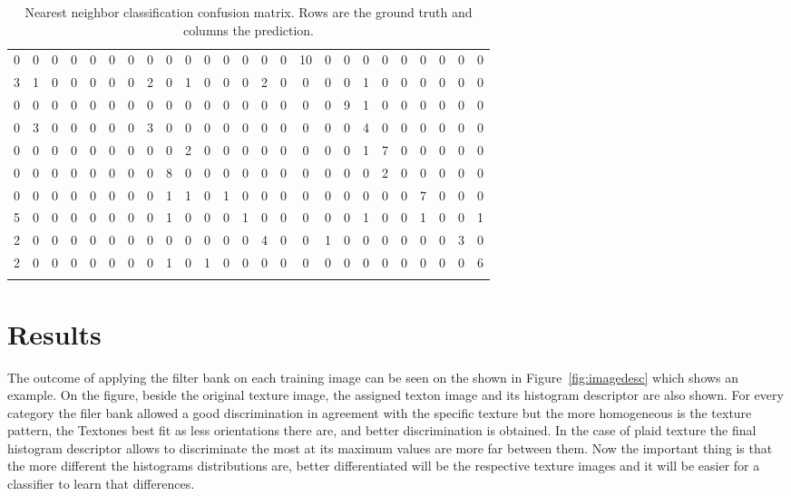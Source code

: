 \documentclass[10pt,twocolumn,letterpaper]{article}
\begin{document}
\begin{table}
\begin{subtable}{.5\textwidth}
\begin{tabular}{|c|c|c|c|c|c|c|c|c|c|c|c|c|c|c|c|c|c|c|c|c|c|c|c|c|}
0 & 0 & 0 & 0 & 0 & 0 & 0 & 0 & 0 & 0 & 0 & 0 & 0 & 0 & 0 & 10 & 0 & 0 & 0 & 0 & 0 & 0 & 0 & 0 & 0\\
3 & 1 & 0 & 0 & 0 & 0 & 0 & 2 & 0 & 1 & 0 & 0 & 0 & 2 & 0 & 0 & 0 & 0 & 1 & 0 & 0 & 0 & 0 & 0 & 0\\
0 & 0 & 0 & 0 & 0 & 0 & 0 & 0 & 0 & 0 & 0 & 0 & 0 & 0 & 0 & 0 & 0 & 9 & 1 & 0 & 0 & 0 & 0 & 0 & 0\\
0 & 3 & 0 & 0 & 0 & 0 & 0 & 3 & 0 & 0 & 0 & 0 & 0 & 0 & 0 & 0 & 0 & 0 & 4 & 0 & 0 & 0 & 0 & 0 & 0\\
0 & 0 & 0 & 0 & 0 & 0 & 0 & 0 & 0 & 2 & 0 & 0 & 0 & 0 & 0 & 0 & 0 & 0 & 1 & 7 & 0 & 0 & 0 & 0 & 0\\
0 & 0 & 0 & 0 & 0 & 0 & 0 & 0 & 8 & 0 & 0 & 0 & 0 & 0 & 0 & 0 & 0 & 0 & 0 & 2 & 0 & 0 & 0 & 0 & 0\\
0 & 0 & 0 & 0 & 0 & 0 & 0 & 0 & 1 & 1 & 0 & 1 & 0 & 0 & 0 & 0 & 0 & 0 & 0 & 0 & 0 & 7 & 0 & 0 & 0\\
5 & 0 & 0 & 0 & 0 & 0 & 0 & 0 & 1 & 0 & 0 & 0 & 1 & 0 & 0 & 0 & 0 & 0 & 1 & 0 & 0 & 1 & 0 & 0 & 1\\
2 & 0 & 0 & 0 & 0 & 0 & 0 & 0 & 0 & 0 & 0 & 0 & 0 & 4 & 0 & 0 & 1 & 0 & 0 & 0 & 0 & 0 & 0 & 3 & 0\\
2 & 0 & 0 & 0 & 0 & 0 & 0 & 0 & 1 & 0 & 1 & 0 & 0 & 0 & 0 & 0 & 0 & 0 & 0 & 0 & 0 & 0 & 0 & 0 & 6\\
\hline\\
\end{tabular}
\end{subtable}
\caption{Nearest neighbor classification confusion matrix. Rows are the ground truth and columns the prediction.}
\label{tab:confNN}
\end{table}


\section{Results}
 
The outcome of applying the filter bank on each training image can be seen on the  shown in Figure~\ref{fig:imagedesc} which shows  an example. On the figure, beside the original texture image, the assigned texton image and its histogram descriptor are also shown. For every category the filer bank allowed a good discrimination in agreement with the specific texture but the more homogeneous is the texture pattern, the Textones best fit as less orientations there are, and better discrimination is obtained. In the case of plaid texture the final histogram descriptor allows to discriminate the most at its maximum values are more far between them. Now the important thing is that the more different the histograms distributions are, better differentiated will be the respective texture images and it will be easier for a classifier to learn that differences.
\end{document}
